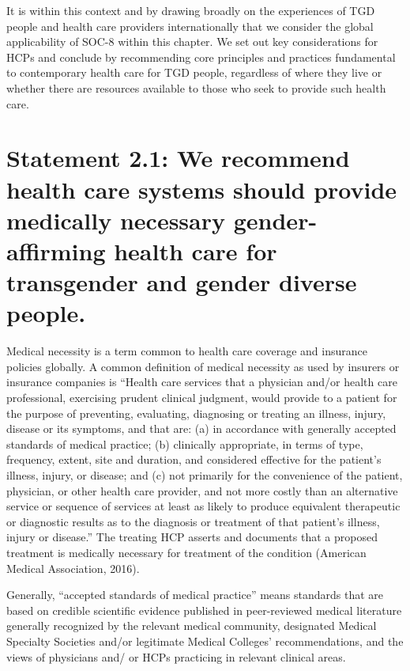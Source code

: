 \documentclass[
]{book}
\begin{document}
It is within this context and by drawing broadly
on the experiences of TGD people and health
care providers internationally that we consider
the global applicability of SOC-8 within this
chapter. We set out key considerations for HCPs
and conclude by recommending core principles
and practices fundamental to contemporary
health care for TGD people, regardless of where
they live or whether there are resources available
to those who seek to provide such health care.

\hypertarget{statement-2.1-we-recommend-health-care-systems-should-provide-medically-necessary-gender-affirming-health-care-for-transgender-and-gender-diverse-people.}{%
\section*{Statement 2.1: We recommend health care systems should provide medically necessary gender-affirming health care for transgender and gender diverse people.}\label{statement-2.1-we-recommend-health-care-systems-should-provide-medically-necessary-gender-affirming-health-care-for-transgender-and-gender-diverse-people.}}

Medical necessity is a term common to health
care coverage and insurance policies globally. A
common definition of medical necessity as used
by insurers or insurance companies is ``Health
care services that a physician and/or health care
professional, exercising prudent clinical judgment,
would provide to a patient for the purpose of
preventing, evaluating, diagnosing or treating an
illness, injury, disease or its symptoms, and that
are: (a) in accordance with generally accepted
standards of medical practice; (b) clinically
appropriate, in terms of type, frequency, extent,
site and duration, and considered effective for
the patient's illness, injury, or disease; and (c)
not primarily for the convenience of the patient,
physician, or other health care provider, and not
more costly than an alternative service or
sequence of services at least as likely to produce
equivalent therapeutic or diagnostic results as to
the diagnosis or treatment of that patient's illness,
injury or disease.'' The treating HCP asserts and
documents that a proposed treatment is medically
necessary for treatment of the condition
(American Medical Association, 2016).

Generally, ``accepted standards of medical practice'' means standards that are based on credible
scientific evidence published in peer-reviewed medical literature generally recognized by the relevant
medical community, designated Medical Specialty
Societies and/or legitimate Medical Colleges' recommendations, and the views of physicians and/
or HCPs practicing in relevant clinical areas.
\end{document}
